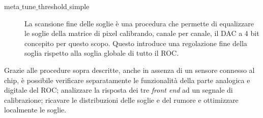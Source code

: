 \begin{description}
\item[meta$\_$tune$\_$threshold$\_$simple] La scansione fine delle soglie \`e una procedura che permette di equalizzare le soglie della matrice di pixel calibrando, canale per canale, il DAC a 4 bit concepito per questo scopo. Questo introduce una regolazione fine della soglia rispetto alla soglia globale di tutto il ROC.
\end{description}

Grazie alle procedure sopra descritte, anche in assenza di un sensore connesso al chip, \`e possibile verificare separatamente le funzionalità della parte analogica e digitale del ROC; analizzare la risposta dei tre \textit{front end} ad un segnale di calibrazione; ricavare le distribuzioni delle soglie e del rumore e ottimizzare localmente le soglie.





